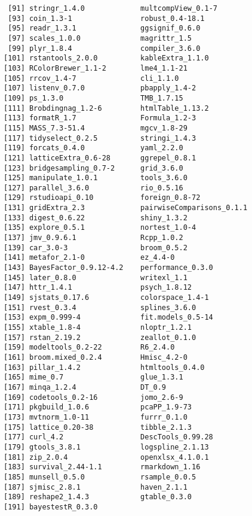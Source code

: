 \documentclass[]{article}
\begin{document}
\begin{verbatim}
 [91] stringr_1.4.0             multcompView_0.1-7       
 [93] coin_1.3-1                robust_0.4-18.1          
 [95] readr_1.3.1               ggsignif_0.6.0           
 [97] scales_1.0.0              magrittr_1.5             
 [99] plyr_1.8.4                compiler_3.6.0           
[101] rstantools_2.0.0          kableExtra_1.1.0         
[103] RColorBrewer_1.1-2        lme4_1.1-21              
[105] rrcov_1.4-7               cli_1.1.0                
[107] listenv_0.7.0             pbapply_1.4-2            
[109] ps_1.3.0                  TMB_1.7.15               
[111] Brobdingnag_1.2-6         htmlTable_1.13.2         
[113] formatR_1.7               Formula_1.2-3            
[115] MASS_7.3-51.4             mgcv_1.8-29              
[117] tidyselect_0.2.5          stringi_1.4.3            
[119] forcats_0.4.0             yaml_2.2.0               
[121] latticeExtra_0.6-28       ggrepel_0.8.1            
[123] bridgesampling_0.7-2      grid_3.6.0               
[125] manipulate_1.0.1          tools_3.6.0              
[127] parallel_3.6.0            rio_0.5.16               
[129] rstudioapi_0.10           foreign_0.8-72           
[131] gridExtra_2.3             pairwiseComparisons_0.1.1
[133] digest_0.6.22             shiny_1.3.2              
[135] explore_0.5.1             nortest_1.0-4            
[137] jmv_0.9.6.1               Rcpp_1.0.2               
[139] car_3.0-3                 broom_0.5.2              
[141] metafor_2.1-0             ez_4.4-0                 
[143] BayesFactor_0.9.12-4.2    performance_0.3.0        
[145] later_0.8.0               writexl_1.1              
[147] httr_1.4.1                psych_1.8.12             
[149] sjstats_0.17.6            colorspace_1.4-1         
[151] rvest_0.3.4               splines_3.6.0            
[153] expm_0.999-4              fit.models_0.5-14        
[155] xtable_1.8-4              nloptr_1.2.1             
[157] rstan_2.19.2              zeallot_0.1.0            
[159] modeltools_0.2-22         R6_2.4.0                 
[161] broom.mixed_0.2.4         Hmisc_4.2-0              
[163] pillar_1.4.2              htmltools_0.4.0          
[165] mime_0.7                  glue_1.3.1               
[167] minqa_1.2.4               DT_0.9                   
[169] codetools_0.2-16          jomo_2.6-9               
[171] pkgbuild_1.0.6            pcaPP_1.9-73             
[173] mvtnorm_1.0-11            furrr_0.1.0              
[175] lattice_0.20-38           tibble_2.1.3             
[177] curl_4.2                  DescTools_0.99.28        
[179] gtools_3.8.1              logspline_2.1.13         
[181] zip_2.0.4                 openxlsx_4.1.0.1         
[183] survival_2.44-1.1         rmarkdown_1.16           
[185] munsell_0.5.0             rsample_0.0.5            
[187] sjmisc_2.8.1              haven_2.1.1              
[189] reshape2_1.4.3            gtable_0.3.0             
[191] bayestestR_0.3.0         
\end{verbatim}
\end{document}
